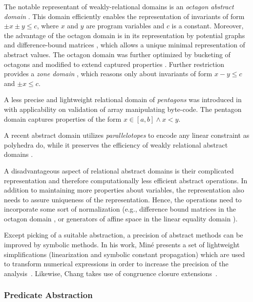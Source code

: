 The notable representant of weakly-relational domains is an \emph{octagon
abstract domain} \cite{Mine2006}. This domain efficiently enables the representation
of invariants of form $\pm x \pm y \leq c$, where $x$ and $y$ are program
variables and $c$ is a constant.  Moreover, the advantage of the octagon domain
is in its representation by potential graphs and difference-bound matrices
\cite{Larsen1997}, which allows a unique minimal representation of abstract
values.
The octagon domain was further optimized by bucketing of octagons
\cite{Blanchet2003, Venet2004} and modified to extend captured properties
\cite{Claris2004, Mine2004}. Further restriction provides a \emph{zone domain}
\cite{Mine2001}, which reasons only about invariants of form $x - y \leq c$ and
$\pm x \leq c$.

A less precise and lightweight relational domain of \emph{pentagons} was introduced in~\cite{Logozzo2010} with applicability on validation of array manipulating
byte-code. The pentagon domain captures properties of the form $x \in [a,b]
\wedge x < y$.

A recent abstract domain utilizes \emph{parallelotopes} to encode any linear
constraint as polyhedra do, while it preserves the efficiency of weakly
relational abstract domains \cite{Amato2017}.

A disadvantageous aspect of relational abstract domains is their complicated
representation and therefore computationally less efficient abstract
operations. In addition to maintaining more properties about variables, the
representation also needs to assure uniqueness of the representation. Hence,
the operations need to incorporate some sort of normalization (e.g., difference
bound matrices in the octagon domain \cite{Mine2006}, or generators of affine
space in the linear equality domain \cite{Karr1976}).

Except picking of a suitable abstraction, a precision of abstract methods can
be improved by symbolic methods. In his work, Miné presents a set of
lightweight simplifications (linearization and symbolic constant propagation)
which are used to transform numerical expressions in order to increase the
precision of the analysis~\cite{Mine2006b}. Likewise, Chang takes use of
congruence closure extensions~\cite{Chang2005}.

\subsubsection{Predicate Abstraction}

